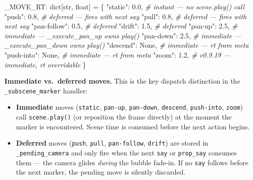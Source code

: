 \documentclass[
  12pt,
  letterpaper,
]{book}
\newenvironment{Shaded}{}{}
\newcommand{\BuiltInTok}[1]{\textcolor[rgb]{0.00,0.50,0.00}{#1}}
\newcommand{\CommentTok}[1]{\textcolor[rgb]{0.38,0.63,0.69}{\textit{#1}}}
\newcommand{\FloatTok}[1]{\textcolor[rgb]{0.25,0.63,0.44}{#1}}
\newcommand{\NormalTok}[1]{#1}
\newcommand{\OperatorTok}[1]{\textcolor[rgb]{0.40,0.40,0.40}{#1}}
\newcommand{\StringTok}[1]{\textcolor[rgb]{0.25,0.44,0.63}{#1}}
\newcommand{\VariableTok}[1]{\textcolor[rgb]{0.10,0.09,0.49}{#1}}
\providecommand{\tightlist}{%
  \setlength{\itemsep}{0pt}\setlength{\parskip}{0pt}}
\begin{document}
\begin{Shaded}
\begin{Highlighting}[]
\NormalTok{\_MOVE\_RT: }\BuiltInTok{dict}\NormalTok{[}\BuiltInTok{str}\NormalTok{, }\BuiltInTok{float}\NormalTok{] }\OperatorTok{=}\NormalTok{ \{}
    \StringTok{"static"}\NormalTok{:     }\FloatTok{0.0}\NormalTok{,    }\CommentTok{\# instant — no scene.play() call}
    \StringTok{"push"}\NormalTok{:       }\FloatTok{0.8}\NormalTok{,    }\CommentTok{\# deferred — fires with next say}
    \StringTok{"pull"}\NormalTok{:       }\FloatTok{0.8}\NormalTok{,    }\CommentTok{\# deferred — fires with next say}
    \StringTok{"pan{-}follow"}\NormalTok{: }\FloatTok{0.5}\NormalTok{,    }\CommentTok{\# deferred}
    \StringTok{"drift"}\NormalTok{:      }\FloatTok{1.5}\NormalTok{,    }\CommentTok{\# deferred}
    \StringTok{"pan{-}up"}\NormalTok{:     }\FloatTok{2.5}\NormalTok{,    }\CommentTok{\# immediate — \_execute\_pan\_up owns play()}
    \StringTok{"pan{-}down"}\NormalTok{:   }\FloatTok{2.5}\NormalTok{,    }\CommentTok{\# immediate — \_execute\_pan\_down owns play()}
    \StringTok{"descend"}\NormalTok{:    }\VariableTok{None}\NormalTok{,   }\CommentTok{\# immediate — rt from meta}
    \StringTok{"push{-}into"}\NormalTok{:  }\VariableTok{None}\NormalTok{,   }\CommentTok{\# immediate — rt from meta}
    \StringTok{"zoom"}\NormalTok{:       }\FloatTok{1.2}\NormalTok{,    }\CommentTok{\# v0.9.19 — immediate, rt overridable}
\NormalTok{\}}
\end{Highlighting}
\end{Shaded}

\textbf{Immediate vs.\ deferred moves.} This is the key dispatch
distinction in the \texttt{\_subscene\_marker} handler:

\begin{itemize}
\tightlist
\item
  \textbf{Immediate} moves (\texttt{static}, \texttt{pan-up},
  \texttt{pan-down}, \texttt{descend}, \texttt{push-into},
  \texttt{zoom}) call \texttt{scene.play()} (or reposition the frame
  directly) at the moment the marker is encountered.  Scene time is
  consumed before the next action begins.
\item
  \textbf{Deferred} moves (\texttt{push}, \texttt{pull},
  \texttt{pan-follow}, \texttt{drift}) are stored in
  \texttt{\_pending\_camera} and only fire when the next \texttt{say} or
  \texttt{prop\_say} consumes them — the camera glides \emph{during} the
  bubble fade-in.  If no \texttt{say} follows before the next marker,
  the pending move is silently discarded.
\end{itemize}
\end{document}
